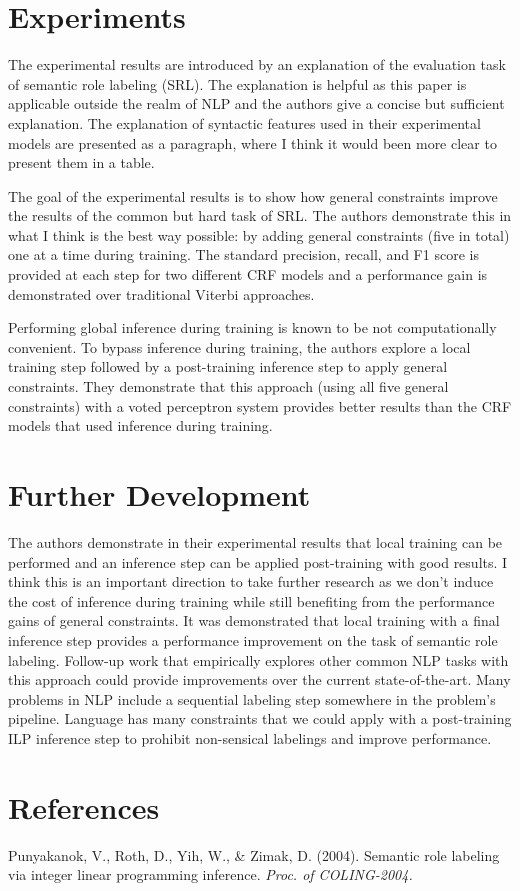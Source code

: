 \documentclass[fleqn,11pt]{wlpeerj} %
\begin{document}
\section*{Experiments}

The experimental results are introduced by an explanation of the evaluation task of semantic role labeling (SRL). The explanation is helpful as this paper is applicable outside the realm of NLP and the authors give a concise but sufficient explanation. The explanation of syntactic features used in their experimental models are presented as a paragraph, where I think it would been more clear to present them in a table.

The goal of the experimental results is to show how general constraints improve the results of the common but hard task of SRL. The authors demonstrate this in what I think is the best way possible: by adding general constraints (five in total) one at a time during training. The standard precision, recall, and F1 score is provided at each step for two different CRF models and a performance gain is demonstrated over traditional Viterbi approaches. 

Performing global inference during training is known to be not computationally convenient. To bypass inference during training, the authors explore a local training step followed by a post-training inference step to apply general constraints. They demonstrate that this approach (using all five general constraints) with a voted perceptron system provides better results than the CRF models that used inference during training. 

\section*{Further Development}

The authors demonstrate in their experimental results that local training can be performed and an inference step can be applied post-training with good results. I think this is an important direction to take further research as we don't induce the cost of inference during training while still benefiting from the performance gains of general constraints. It was demonstrated that local training with a final inference step provides a performance improvement on the task of semantic role labeling. Follow-up work that empirically explores other common NLP tasks with this approach could provide improvements over the current state-of-the-art. Many problems in NLP include a sequential labeling step somewhere in the problem's pipeline. Language has many constraints that we could apply with a post-training ILP inference step to prohibit non-sensical labelings and improve performance.

\section*{References}

Punyakanok, V., Roth, D., Yih, W., \& Zimak, D. (2004). Semantic role labeling via integer linear \hspace*{1em} programming inference. \textit{Proc. of COLING-2004.}
\end{document}
